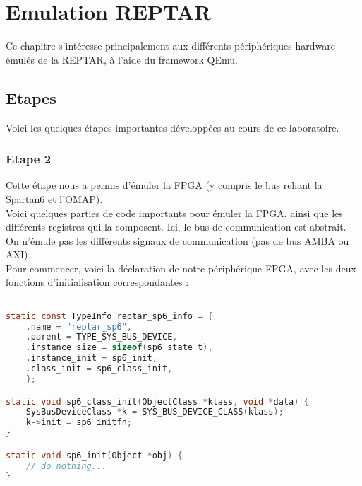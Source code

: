 
\chapter{Emulation REPTAR} %

\label{Chapitre 3} %


Ce chapitre s'intéresse principalement aux différents périphériques hardware émulés de la REPTAR, à l'aide du framework QEmu.

\section{Etapes}
Voici les quelques étapes importantes développées au cours de ce laboratoire. 

\subsection{Etape 2}
Cette étape nous a permis d'émuler la FPGA (y compris le bus reliant la Spartan6 et l'OMAP).\\


Voici quelques parties de code importants pour émuler la FPGA, ainsi que les différents registres qui la composent. Ici, le bus de communication est abstrait. On n'émule pas les différents signaux de communication (pas de bus AMBA ou AXI).\\

Pour commencer, voici la déclaration de notre périphérique FPGA, avec les deux fonctions d'initialisation correspondantes : 
\begin{lstlisting}[language=C,caption=Spartan 6 device declaration]

static const TypeInfo reptar_sp6_info = { 
	.name = "reptar_sp6", 
	.parent = TYPE_SYS_BUS_DEVICE, 
	.instance_size = sizeof(sp6_state_t),
	.instance_init = sp6_init, 
	.class_init = sp6_class_init, 
	};

static void sp6_class_init(ObjectClass *klass, void *data) {
	SysBusDeviceClass *k = SYS_BUS_DEVICE_CLASS(klass);
	k->init = sp6_initfn;
}

static void sp6_init(Object *obj) {
	// do nothing...
}	
\end{lstlisting}

